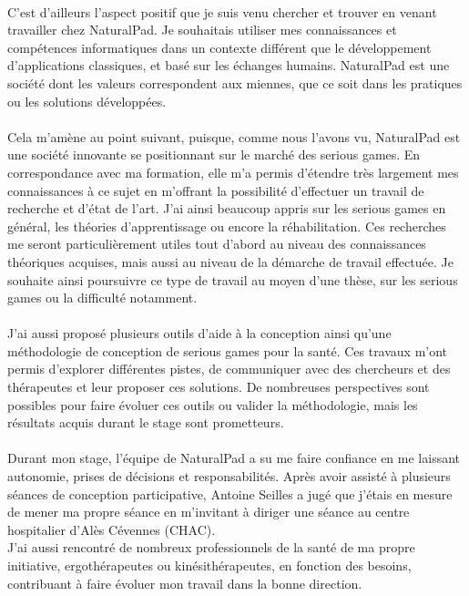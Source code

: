 \paragraph{} C'est d'ailleurs l'aspect positif que je suis venu chercher et trouver en venant travailler chez NaturalPad. Je souhaitais utiliser mes connaissances et compétences informatiques dans un contexte différent que le développement d'applications classiques, et basé sur les échanges humains. NaturalPad est une société dont les valeurs correspondent aux miennes, que ce soit dans les pratiques ou les solutions développées.

\paragraph{} Cela m'amène au point suivant, puisque, comme nous l'avons vu, NaturalPad est une société innovante se positionnant sur le marché des serious games. En correspondance avec ma formation, elle m'a permis d'étendre très largement mes connaissances à ce sujet en m'offrant la possibilité d'effectuer un travail de recherche et d'état de l'art. J'ai ainsi beaucoup appris sur les serious games en général, les théories d'apprentissage ou encore la réhabilitation. Ces recherches me seront particulièrement utiles tout d'abord au niveau des connaissances théoriques acquises, mais aussi au niveau de la démarche de travail effectuée. Je souhaite ainsi poursuivre ce type de travail au moyen d'une thèse, sur les serious games ou la difficulté notamment. 

\paragraph{} J'ai aussi proposé plusieurs outils d'aide à la conception ainsi qu'une méthodologie de conception  de serious games pour la santé. Ces travaux m'ont permis d'explorer différentes pistes, de communiquer avec des chercheurs et des thérapeutes et 
leur proposer ces solutions. De nombreuses perspectives sont possibles pour faire évoluer ces outils ou valider la méthodologie, mais les résultats acquis durant le stage sont prometteurs.

\paragraph{} Durant mon stage, l'équipe de NaturalPad a su me faire confiance en me laissant autonomie, prises de décisions et responsabilités. Après avoir assisté à plusieurs séances de conception participative, Antoine Seilles a jugé que j'étais en mesure de mener ma propre séance en m'invitant à diriger une séance au centre hospitalier d'Alès Cévennes (CHAC). \\
J'ai aussi rencontré de nombreux professionnels de la santé de ma propre initiative, ergothérapeutes ou kinésithérapeutes, en fonction des besoins, contribuant à faire évoluer mon travail dans la bonne direction.

